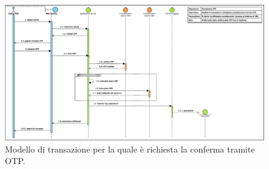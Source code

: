 \begin{figure}[h]
	\centering
	\includegraphics[width=\textwidth]{Images/sequence/Transazione_OTP.eps}
	\caption{Modello di transazione per la quale è richiesta la conferma tramite OTP.}
	\label{fig:sequence:transazione-otp:modello}
\end{figure}
